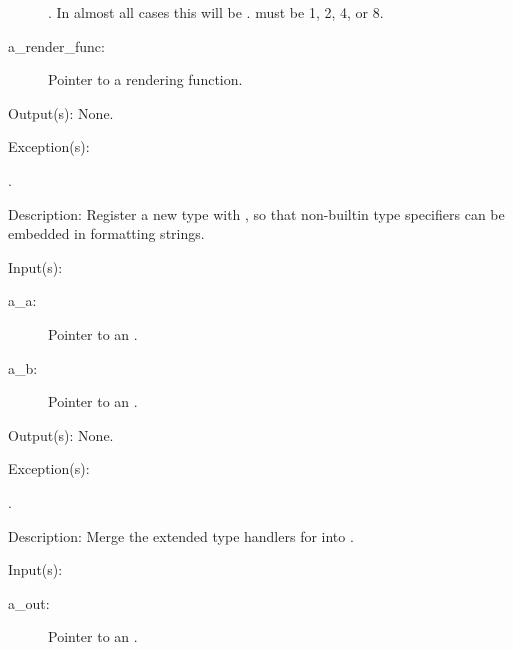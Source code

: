 \begin{capi}
\begin{capilist}
\begin{description}
			.  In almost all cases this will be
			.   must be 1, 2, 4,
			or 8.
		\item[a\_render\_func: ]
			Pointer to a rendering function.
		\end{description}
	\item[Output(s): ] None.
	\item[Exception(s): ]
		\begin{description}\item[]
		\item[.]
		\end{description}
	\item[Description: ]
		Register a new type with , so that non-builtin type
		specifiers can be embedded in formatting strings.
	\end{capilist}
\label{out_merge}
	\begin{capilist}
	\item[Input(s): ]
		\begin{description}\item[]
		\item[a\_a: ]
			Pointer to an .
		\item[a\_b: ]
			Pointer to an .
		\end{description}
	\item[Output(s): ] None.
	\item[Exception(s): ]
		\begin{description}\item[]
		\item[.]
		\end{description}
	\item[Description: ]
		Merge the extended type handlers for  into
		.
	\end{capilist}
\label{out_default_fd_get}
	\begin{capilist}
	\item[Input(s): ]
		\begin{description}\item[]
		\item[a\_out: ]
			Pointer to an \classname{out}.
		\end{description}

\end{capilist}
\end{capi}
